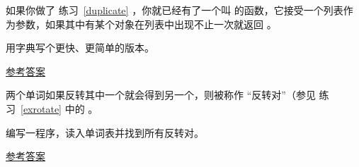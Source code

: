 \begin{exercise}



如果你做了 练习~\ref{duplicate} ，你就已经有了一个叫  的函数，它接受一个列表作为参数，如果其中有某个对象在列表中出现不止一次就返回 。

用字典写个更快、更简单的版本。

\href{http://thinkpython2.com/code/has_duplicates.py}{参考答案}


\end{exercise}


\begin{exercise}
\label{exrotatepairs}

  


两个单词如果反转其中一个就会得到另一个，则被称作 ``反转对''（参见 练习~\ref{exrotate} 中的  。

编写一程序，读入单词表并找到所有反转对。

\href{http://thinkpython2.com/code/rotate_pairs.py}{参考答案}

\end{exercise}


